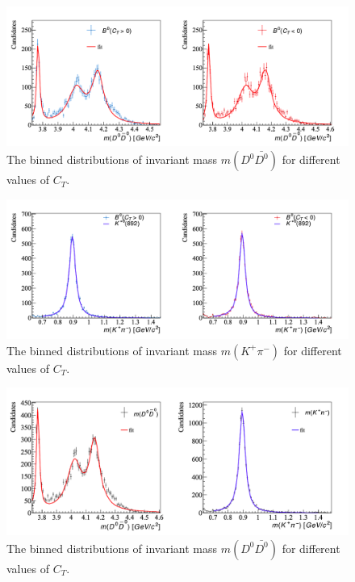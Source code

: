 \begin{figure}[h]
\center
\includegraphics*[width=0.96\linewidth]{CM_variables_B0/B0_invmass_D0Dbar0_fit_10000}
\caption{The binned distributions of invariant mass $m(D^0\bar{D^0})$ for different values of $C_T$.}
\label{invddv3}
\end{figure}
\begin{figure}[h]
\center
\includegraphics*[width=0.96\linewidth]{CM_variables_B0/B0_invmass_KpPim_fit_10000}
\caption{The binned distributions of invariant mass $m(K^+\pi^-)$ for different values of $C_T$.}
\label{invkpiv3}
\end{figure}
\begin{figure}[h]
\center
\includegraphics*[width=0.96\linewidth]{CM_variables_B0/B0_invariant_mass_fit_10000}
\caption{The binned distributions of invariant mass $m(D^0\bar{D^0})$ for different values of $C_T$.}
\label{invfit3}
\end{figure}
